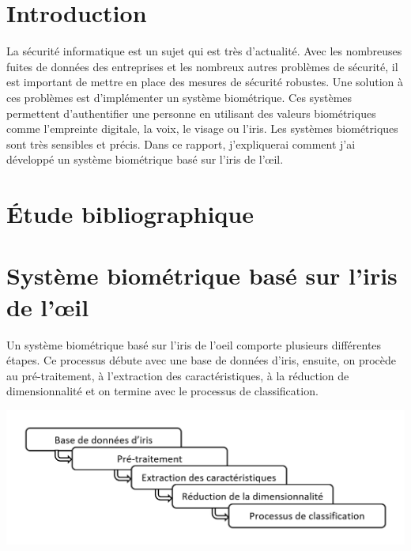 \documentclass[12pt,twoside,letterpaper]{article}
\begin{document}



\tableofcontents
\newpage

\section{Introduction}
La sécurité informatique est un sujet qui est très d'actualité. Avec les nombreuses fuites de données des entreprises et les nombreux autres problèmes de sécurité, il est important de mettre en place des mesures de sécurité robustes. Une solution à ces problèmes est d'implémenter un système biométrique. Ces systèmes permettent d'authentifier une personne en utilisant des valeurs biométriques comme l'empreinte digitale, la voix, le visage ou l'iris. Les systèmes biométriques sont très sensibles et précis. Dans ce rapport, j'expliquerai comment j'ai développé un système biométrique basé sur l’iris de l’œil.
\cite{ref_06}

\section{Étude bibliographique}

\cite{ref_07}

\cite{ref_08}

\cite{ref_09}

\cite{ref_10}

\section{Système biométrique basé sur l’iris de l’œil}

Un système biométrique basé sur l'iris de l'oeil comporte plusieurs différentes étapes. Ce processus débute avec une base de données d'iris, ensuite, on procède au pré-traitement, à l'extraction des caractéristiques, à la réduction de dimensionnalité et on termine avec le processus de classification. 

\begin{center}
    \includegraphics[width = 14cm]{schema}
\end{center}
\end{document}
